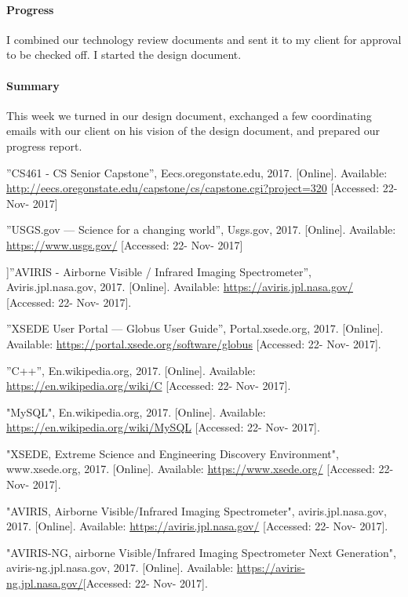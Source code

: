 \documentclass[onecolumn, draftclsnofoot,10pt, compsoc]{IEEEtran}
\begin{document}
\paragraph{Progress}
 I combined our technology review documents and sent it to my client for approval to be checked off. I started the design document.
\paragraph{Summary}
This week we turned in our design document, exchanged a few coordinating emails with our client on his vision of the design document, and prepared our progress report.

\begin{thebibliography}{9}
 ”CS461 - CS Senior Capstone”, Eecs.oregonstate.edu, 2017. [Online]. Available: \url{http://eecs.oregonstate.edu/capstone/cs/capstone.cgi?project=320} [Accessed: 22- Nov- 2017]

 ”USGS.gov — Science for a changing world”, Usgs.gov, 2017. [Online]. Available: \url{https://www.usgs.gov/} [Accessed: 22- Nov- 2017]

 ]”AVIRIS - Airborne Visible / Infrared Imaging Spectrometer”, Aviris.jpl.nasa.gov, 2017. [Online]. Available:
\url{https://aviris.jpl.nasa.gov/} [Accessed: 22- Nov- 2017].

 ”XSEDE User Portal — Globus User Guide”, Portal.xsede.org, 2017. [Online]. Available: \url{https://portal.xsede.org/software/globus} [Accessed: 22- Nov- 2017].

 ”C++”, En.wikipedia.org, 2017. [Online]. Available:
\url{https://en.wikipedia.org/wiki/C} [Accessed: 22- Nov- 2017].

 "MySQL", En.wikipedia.org, 2017. [Online]. Available: \url{https://en.wikipedia.org/wiki/MySQL} [Accessed: 22- Nov- 2017].

 "XSEDE, Extreme Science and Engineering Discovery Environment", www.xsede.org, 2017. [Online]. Available: \url{https://www.xsede.org/} [Accessed: 22- Nov- 2017].

 "AVIRIS, Airborne Visible/Infrared Imaging Spectrometer", aviris.jpl.nasa.gov, 2017. [Online]. Available: \url{https://aviris.jpl.nasa.gov/} [Accessed: 22- Nov- 2017].

 "AVIRIS-NG, airborne Visible/Infrared Imaging Spectrometer Next Generation", aviris-ng.jpl.nasa.gov, 2017. [Online]. Available: \url{https://aviris-ng.jpl.nasa.gov/}[Accessed: 22- Nov- 2017].


\end{thebibliography}
\end{document}
